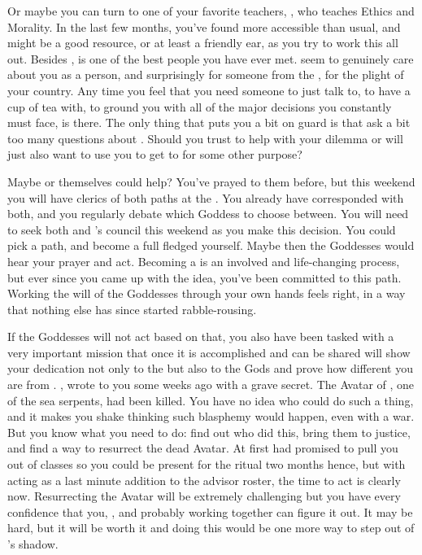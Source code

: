 \documentclass[char]{GL2020}
\begin{document}
Or maybe you can turn to one of your favorite teachers, \cEthics{\full}, who teaches Ethics and Morality. In the last few months, you've found \cEthics{\them} more accessible than usual, and \cEthics{\they} might be a good resource, or at least a friendly ear, as you try to work this all out. Besides \cFlowPriest{}, \cEthics{} is one of the best people you have ever met. \cEthics{\They} seem\cEthics{\verbs} to genuinely care about you as a person, and surprisingly for someone from the \pTech{}, for the plight of your country. Any time you feel that you need someone to just talk to, to have a cup of tea with, to ground you with all of the major decisions you constantly must face, \cEthics{} is there. The only thing that puts you a bit on guard is that \cEthics{\theydo} ask a bit too many questions about \cLoud{}. Should you trust \cEthics{} to help with your dilemma or will \cEthics{\they} just also want to use you to get to \cLoud{} for some other purpose?  

Maybe \cEbb{} or \cFlow{} themselves could help? You've prayed to them before, but this weekend you will have clerics of both paths at the \pSc{}. You already have corresponded with both, and you regularly debate which Goddess to choose between. You will need to seek both \cFlowPriest{} and \cEbbPriest{}’s council this weekend as you make this decision. You could pick a path, and become a full fledged \cWarlordDaughter{\cleric} yourself. Maybe then the Goddesses would hear your prayer and act. Becoming a \cWarlordDaughter{\cleric} is an involved and life-changing process, but ever since you came up with the idea, you've been committed to this path. Working the will of the Goddesses through your own hands feels right, in a way that nothing else has since \cLoud{} started rabble-rousing.

If the Goddesses will not act based on that, you also have been tasked with a very important mission that once it is accomplished and can be shared will show your dedication not only to the \pShip{} but also to the Gods and prove how different you are from \cLoud{}. \cEbbPriest{}, wrote to you some weeks ago with a grave secret. The Avatar of \cEbb{}, one of the sea serpents, had been killed. You have no idea who could do such a thing, and it makes you shake thinking such blasphemy would happen, even with a war. But you know what you need to do: find out who did this, bring them to justice, and find a way to resurrect the dead Avatar. At first \cEbbPriest{} had promised to pull you out of classes so you could be present for the ritual two months hence, but with \cEbbPriest{} acting as a last minute addition to the advisor roster, the time to act is clearly now. Resurrecting the Avatar will be extremely challenging but you have every confidence that you, \cEbbPriest{}, \cFlowPriest{} and probably \cInitiate{} working together can figure it out. It may be hard, but it will be worth it and doing this would be one more way to step out of \cLoud{}’s shadow.
\end{document}
